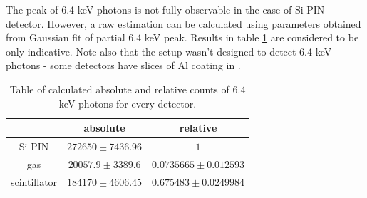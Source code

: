 The peak of 6.4 keV photons is not fully observable in the case of Si PIN detector. However, a raw estimation can be calculated using parameters obtained from Gaussian fit of partial 6.4 keV peak. Results in table \ref{64kevEFF} are considered to be only indicative. Note also that the setup wasn't designed to detect 6.4 keV photons - some detectors have slices of Al coating in .  

\begin{table}[H]
\centering
\begin{tabular}{|c|c|c|}
\hline
   & absolute & relative \\ \hline
Si PIN & $272650 \pm 7436.96$    & $1$  \\ \hline
gas & $20057.9 \pm 3389.6$    & $0.0735665 \pm 0.012593$ \\ \hline
scintillator  & $184170 \pm 4606.45$    & $0.675483 \pm 0.0249984$ \\ \hline
\end{tabular}
\caption{Table of calculated absolute and relative counts of 6.4 keV photons for every detector.}
 \label{64kevEFF}
\end{table}



